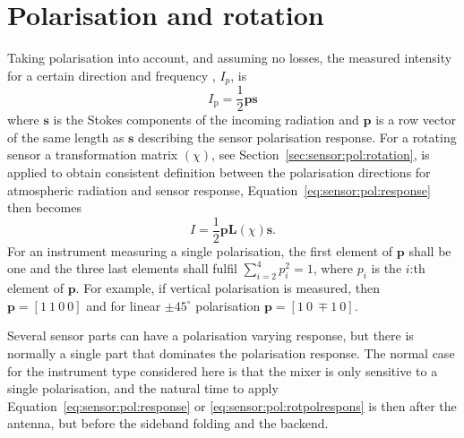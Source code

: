 \section{Polarisation and rotation}
\label{sec:sensor:pol}
Taking polarisation into account, and assuming no losses, the measured
intensity for a certain direction and frequency , $I_p$, is
\begin{equation}
\label{eq:sensor:pol:response}
  I_\mathrm{p} = \frac{1}{2} \mathbf{p} \mathbf{s}
\end{equation}
where $\mathbf{s}$ is the Stokes components of the incoming radiation
and $\mathbf{p}$ is a row vector of the same length as $\mathbf{s}$
describing the sensor polarisation response. For a rotating sensor a
transformation matrix $(\chi)$, see
Section~\ref{sec:sensor:pol:rotation}, is applied to obtain consistent
definition between the polarisation directions for atmospheric
radiation and sensor response, Equation~\ref{eq:sensor:pol:response}
then becomes
\begin{equation}
\label{eq:sensor:pol:rotpolrespons}
  I = \frac{1}{2} \mathbf{p} \mathbf{L}(\chi) \mathbf{s}.
\end{equation}
For an instrument measuring a single polarisation, the first element
of $\mathbf{p}$ shall be one and the three last elements shall fulfil
$\sum_{i=2}^4 p_i^2 = 1$, where $p_i$ is the $i$:th element of
$\mathbf{p}$. For example, if vertical polarisation is measured, then
$\mathbf{p}=[1\ 1\ 0\ 0]$ and for linear $\pm45^\circ$ polarisation
$\mathbf{p}=[1\ 0\ \mp\!\!1\ 0]$.

Several sensor parts can have a polarisation varying response, but
there is normally a single part that dominates the polarisation
response. The normal case for the instrument type considered here is
that the mixer is only sensitive to a single polarisation, and the
natural time to apply Equation~\ref{eq:sensor:pol:response} or
\ref{eq:sensor:pol:rotpolrespons} is then after the antenna, but
before the sideband folding and the backend.

